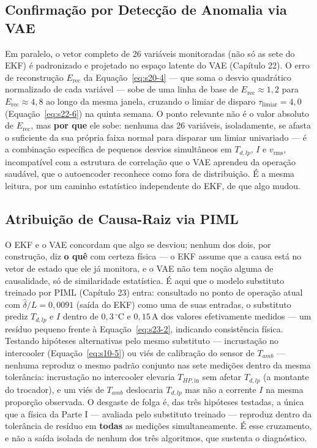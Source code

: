 \documentclass[12pt,a4paper]{article}
\numberwithin{equation}{section}
\numberwithin{table}{section}
\numberwithin{figure}{section}
\begin{document}
\subsection{Confirmação por Detecção de Anomalia via VAE}

Em paralelo, o vetor completo de 26 variáveis monitoradas (não só as sete do EKF) é padronizado e projetado no espaço latente do VAE (Capítulo 22). O erro de reconstrução $E_{\text{rec}}$ da Equação~\eqref{eq:s20-4} — que soma o desvio quadrático normalizado de cada variável — sobe de uma linha de base de $E_{\text{rec}} \approx 1{,}2$ para $E_{\text{rec}} \approx 4{,}8$ ao longo da mesma janela, cruzando o limiar de disparo $\tau_{\text{limiar}} = 4{,}0$ (Equação~\eqref{eq:s22-6}) na quinta semana. O ponto relevante não é o valor absoluto de $E_{\text{rec}}$, mas \textbf{por que} ele sobe: nenhuma das 26 variáveis, isoladamente, se afasta o suficiente da sua própria faixa normal para disparar um limiar univariado — é a combinação específica de pequenos desvios simultâneos em $T_{d,lp}$, $I$ e $v_{\text{rms}}$, incompatível com a estrutura de correlação que o VAE aprendeu da operação saudável, que o autoencoder reconhece como fora de distribuição. É a mesma leitura, por um caminho estatístico independente do EKF, de que algo mudou.

\subsection{Atribuição de Causa-Raiz via PIML}

O EKF e o VAE concordam que algo se desviou; nenhum dos dois, por construção, diz \textbf{o quê} com certeza física — o EKF assume que a causa está no vetor de estado que ele já monitora, e o VAE não tem noção alguma de causalidade, só de similaridade estatística. É aqui que o modelo substituto treinado por PIML (Capítulo 23) entra: consultado no ponto de operação atual com $\hat\delta/L = 0{,}0091$ (saída do EKF) como uma de suas entradas, o substituto prediz $T_{d,lp}$ e $I$ dentro de $0{,}3\,^{\circ}\text{C}$ e $0{,}15\,\text{A}$ dos valores efetivamente medidos — um resíduo pequeno frente à Equação~\eqref{eq:s23-2}, indicando consistência física. Testando hipóteses alternativas pelo mesmo substituto — incrustação no intercooler (Equação~\eqref{eq:s10-5}) ou viés de calibração do sensor de $T_{amb}$ — nenhuma reproduz o mesmo padrão conjunto nas sete medições dentro da mesma tolerância: incrustação no intercooler elevaria $T_{HP,\text{in}}$ sem afetar $T_{d,lp}$ (a montante do trocador), e um viés de $T_{amb}$ deslocaria $T_{d,lp}$ mas não a corrente $I$ na mesma proporção observada. O desgaste de folga é, das três hipóteses testadas, a única que a física da Parte I — avaliada pelo substituto treinado — reproduz dentro da tolerância de resíduo em \textbf{todas} as medições simultaneamente. É esse cruzamento, e não a saída isolada de nenhum dos três algoritmos, que sustenta o diagnóstico.
\end{document}
